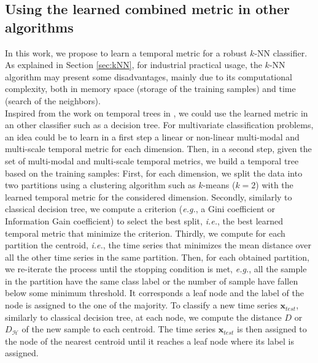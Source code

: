\subsection*{Using the learned combined metric in other algorithms}
In this work, we propose to learn a temporal metric for a robust $k$-NN classifier. As explained in Section \ref{sec:kNN}, for industrial practical usage, the $k$-NN algorithm may present some disadvantages, mainly due to its computational complexity, both in memory space (storage of the training samples) and time (search of the neighbors). \\
Inspired from the work on temporal trees in \cite{AhlameDouzal-Chouakria2012}, we could use the learned metric in an other classifier such as a decision tree. For multivariate classification problems, an idea could be to learn in a first step a linear or non-linear multi-modal and multi-scale temporal metric for each dimension. Then, in a second step, given the set of multi-modal and multi-scale temporal metrics, we build a temporal tree based on the training samples: First, for each dimension, we split the data into two partitions using a clustering algorithm such as $k$-means ($k=2$) with the learned temporal metric for the considered dimension. Secondly, similarly to classical decision tree, we compute a criterion (\textit{e.g.}, a Gini coefficient or Information Gain coefficient) to select the best split, \textit{i.e.}, the best learned temporal metric that minimize the criterion. Thirdly, we compute for each partition the centroid, \textit{i.e.}, the time series that minimizes the mean distance over all the other time series in the same partition. Then, for each obtained partition, we re-iterate the process until the stopping condition is met, \textit{e.g.}, all the sample in the partition have the same class label or the number of sample have fallen below some minimum threshold. It corresponds a leaf node and the label of the node is assigned to the one of the majority. To classify a new time series $\textbf{x}_{test}$, similarly to classical decision tree, at each node, we compute the distance $D$ or $D_\mathcal{H}$ of the new sample to each centroid. The time series $\textbf{x}_{test}$ is then assigned to the node of the nearest centroid until it reaches a leaf node where its label is assigned.



